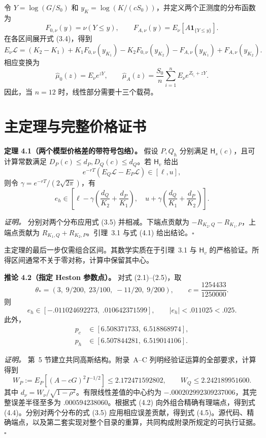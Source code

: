 令 \(Y=\log(G/S_0)\) 和 \(y_K=\log(K/(cS_0))\)，并定义两个正测度的分布函数为
\[
F_{0,\nu}(y)=\nu(Y\le y),\qquad
F_{A,\nu}(y)=E_\nu[A\mathbf1_{\{Y\le y\}}].
\]
在各区间展开式 (3.4)，得到
\[
E_\nu\mathcal L=(K_2-K_1)
+K_1F_{0,\nu}(y_{K_1})-K_2F_{0,\nu}(y_{K_2})
-F_{A,\nu}(y_{K_1})+F_{A,\nu}(y_{K_2}).
\tag{3.6}
\]
相应变换为
\[
\widehat\mu_0(z)=E_\nu e^{zY},\qquad
\widehat\mu_A(z)=\frac{S_0}{n}\sum_{i=1}^n
E_\nu e^{Z_{t_i}+zY}.
\tag{3.7}
\]
因此，当 \(n=12\) 时，线性部分需要十三个载荷。

\section{主定理与完整价格证书}

\textbf{定理 4.1（两个模型价格差的带符号包络）。}
假设 \(P,Q_h\) 分别满足 \(\mathsf H_s(c)\)，且可计算常数满足
\(D_P(c)\le d_P,D_Q(c)\le d_Q\)。若 \(\mathsf H_v\) 给出
\[
e^{-rT}(E_Q\mathcal L-E_P\mathcal L)\in[\ell,u],
\tag{4.1}
\]
则令 \(\gamma=e^{-rT}/(2\sqrt{2\pi})\)，有
\[
\boxed{
e_h\in
\left[
\ell-\gamma\!\left(\frac{d_Q}{K_2}+\frac{d_P}{K_1}\right),
\quad
u+\gamma\!\left(\frac{d_Q}{K_1}+\frac{d_P}{K_2}\right)
\right].}
\tag{4.2}
\]

\textit{证明。} 分别对两个分布应用式 (3.5) 并相减。下端点贡献为
\(-R_{K_2,Q}-R_{K_1,P}\)，上端点贡献为
\(R_{K_1,Q}+R_{K_2,P}\)。引理~3.1 与式 (4.1) 给出结论。\hfill\(\square\)

主定理的最后一步仅需组合区间。其数学实质在于引理~3.1 与 \(\mathsf H_v\) 的严格验证。所得区间通常不关于零对称，计算中保留其中心。


\textbf{推论 4.2（指定 Heston 参数点）。}
对式 (2.1)--(2.5)，取
\[
\theta_*=(3,\;9/200,\;23/100,\;-11/20,\;9/200),\qquad
c=\frac{1254433}{1250000}.
\tag{4.3}
\]
则
\[
e_h\in[-.011024692273,\;.010642371599],\qquad |e_h|<.011025<.025.
\tag{4.4}
\]
此外，
\[
\begin{aligned}
p_c&\in[6.508371733,\;6.518868974],\\
p_h&\in[6.507844281,\;6.519014106].
\end{aligned}
\tag{4.5}
\]

\textit{证明。} 第~5 节建立共同高斯结构。附录~A--C 列明经验证运算的全部要求，计算得到
\[
W_P:=E_P[(A-cG)^2I^{-1/2}]\le2.172471592802,\qquad
W_Q\le2.242189951600.
\tag{4.6}
\]
其中 \(d_\nu=W_\nu/\sqrt{1-\rho^2}\)。有限线性差值的中心约为
\(-.000202992309237006\)，其完整误差半径至多为
\(.000594238060\)。根据式 (4.2) 向外组合精确有理端点，得到式 (4.4)。分别对两个分布的式 (3.5) 应用相应误差贡献，得到式 (4.5)。源代码、精确端点，以及第二套实现对整个目录的重算，共同构成附录所规定的可执行证据。\hfill\(\square\)

